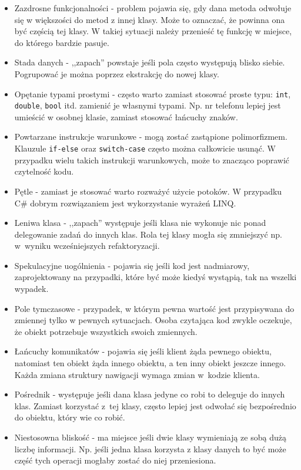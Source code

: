 \begin{itemize}
	\item Zazdrosne funkcjonalności - problem pojawia się, gdy dana metoda odwołuje się w większości do metod z innej klasy. Może to oznaczać, że powinna ona być częścią tej klasy. W takiej sytuacji należy przenieść tę funkcję w miejsce, do którego bardzie pasuje.
	\item Stada danych - ,,zapach'' powstaje jeśli pola często występują blisko siebie. Pogrupować je można poprzez ekstrakcję do nowej klasy. 
	\item Opętanie typami prostymi - często warto zamiast stosować proste typu: \texttt{int}, \texttt{double}, \texttt{bool} itd. zamienić je własnymi typami. Np. nr telefonu lepiej jest umieścić w osobnej klasie, zamiast stosować łańcuchy znaków.
	\item Powtarzane instrukcje warunkowe - mogą zostać zastąpione polimorfizmem. Klauzule \texttt{if-else} oraz \texttt{switch-case} często można całkowicie usunąć. W przypadku wielu takich instrukcji warunkowych, może to znacząco poprawić czytelność kodu.
	\item Pętle - zamiast je stosować warto rozważyć użycie potoków. W przypadku C\# dobrym rozwiązaniem jest wykorzystanie wyrażeń LINQ.
	\item Leniwa klasa - ,,zapach'' występuje jeśli klasa nie wykonuje nic ponad delegowanie zadań do innych klas. Rola tej klasy mogła się zmniejszyć np. w~wyniku wcześniejszych refaktoryzacji. 
	\item Spekulacyjne uogólnienia - pojawia się jeśli kod jest nadmiarowy, zaprojektowany na przypadki, które być może kiedyś wystąpią, tak na wszelki wypadek.
	\item Pole tymczasowe - przypadek, w którym pewna wartość jest przypisywana do zmiennej tylko w pewnych sytuacjach. Osoba czytająca kod zwykle oczekuje, że obiekt potrzebuje wszystkich swoich zmiennych.
	\item Łańcuchy komunikatów - pojawia się jeśli klient żąda pewnego obiektu, natomiast ten obiekt żąda innego obiektu, a ten inny obiekt jeszcze innego. Każda zmiana struktury nawigacji wymaga zmian w~kodzie klienta.
	\item Pośrednik - występuje jeśli dana klasa jedyne co robi to deleguje do innych klas. Zamiast korzystać z~tej klasy, często lepiej jest odwołać się bezpośrednio do obiektu, który wie co robić.
	\item Niestosowna bliskość - ma miejsce jeśli dwie klasy wymieniają ze sobą dużą liczbę informacji. Np. jeśli jedna klasa korzysta z klasy danych to być może część tych operacji mogłaby zostać do niej przeniesiona. 

\end{itemize}
